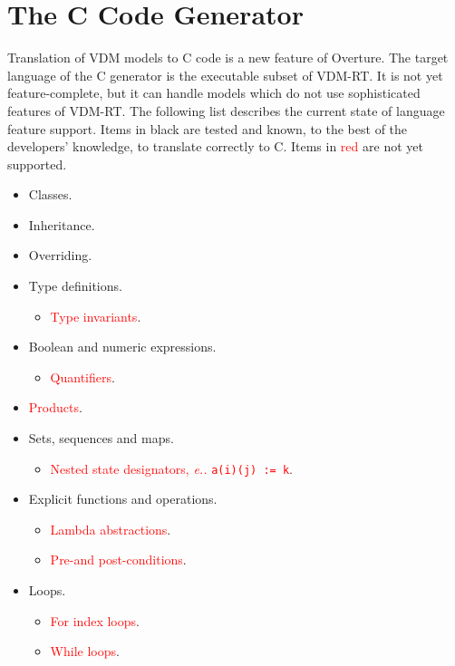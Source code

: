 \section{The C Code Generator}
Translation of VDM models to C code is a new feature of Overture.
%
The target language of the C generator is the executable subset of VDM-RT.
%
It is not yet feature-complete, but it can handle models which do not use sophisticated features of VDM-RT.
%
The following list describes the current state of language feature support.
%
Items in black are tested and known, to the best of the developers' knowledge, to translate correctly to C.
%
Items in \textcolor{red}{red} are not yet supported.
%
%
%
\begin{itemize}
%
\item  Classes.
%
\item  Inheritance.
%
\item  Overriding.
%
\item  Type definitions.
\begin{itemize}
\item  \textcolor{red}{Type invariants}.
\end{itemize}
%
\item  Boolean and numeric expressions.
\begin{itemize}
\item  \textcolor{red}{Quantifiers}.
\end{itemize}
%
\item  \textcolor{red}{Products}.
%
\item  Sets, sequences and maps.
\begin{itemize}
\item  \textcolor{red}{Nested state designators, \emph{e.\@g.\@} \texttt{a(i)(j) := k}}.
\end{itemize}
%
\item  Explicit functions and operations.
\begin{itemize}
\item  \textcolor{red}{Lambda abstractions}.
\item  \textcolor{red}{Pre-\@ and post-conditions}.
\end{itemize}
%
\item  Loops.
\begin{itemize}
\item  \textcolor{red}{For index loops}.
\item  \textcolor{red}{While loops}.
\end{itemize}


\end{itemize}
